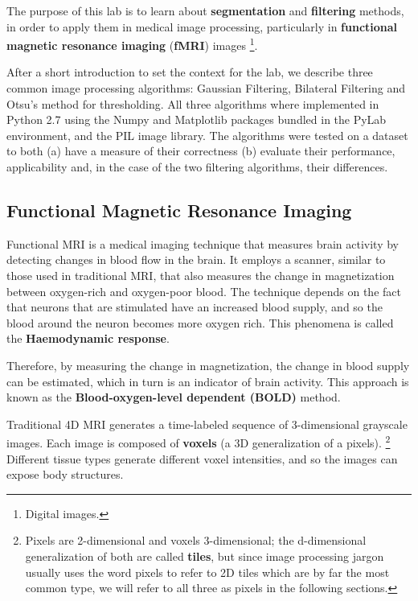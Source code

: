 
The purpose of this lab is to learn about \textbf{segmentation} and \textbf{filtering} methods, in order to apply them in medical image processing, particularly in \textbf{functional magnetic resonance imaging} (\textbf{fMRI}) images \footnote{Digital images.}.

After a short introduction to set the context for the lab, we describe three common image processing algorithms: Gaussian Filtering, Bilateral Filtering and Otsu's method for thresholding. All three algorithms where implemented in Python 2.7 using the Numpy and Matplotlib packages bundled in the PyLab environment, and the PIL image library. The algorithms were tested on a dataset to both (a) have a measure of their correctness (b) evaluate their performance, applicability and, in the case of the two filtering algorithms, their differences.


\subsection*{Functional Magnetic Resonance Imaging}
Functional MRI is a medical imaging technique that measures brain activity by detecting changes in blood flow in the brain. It employs a scanner, similar to those used in traditional MRI, that also measures the change in magnetization between oxygen-rich and oxygen-poor blood. The technique depends on the fact that neurons that are stimulated have an increased blood supply, and so the blood around the neuron becomes more oxygen rich. This phenomena is called the \textbf{Haemodynamic response}. 

Therefore, by measuring the change in magnetization, the change in blood supply can be estimated, which in turn is an indicator of brain activity. This approach is known as the \textbf{Blood-oxygen-level dependent (BOLD)} method.

Traditional 4D MRI generates a time-labeled sequence of 3-dimensional grayscale images. Each image is composed of \textbf{voxels} (a 3D generalization of a pixels). \footnote{Pixels are 2-dimensional and voxels 3-dimensional; the d-dimensional generalization of both are called \textbf{tiles}, but since image processing jargon usually uses the word pixels to refer to 2D tiles which are by far the most common type, we will refer to all three as pixels in the following sections.} Different tissue types generate different voxel intensities, and so the images can expose body structures.

